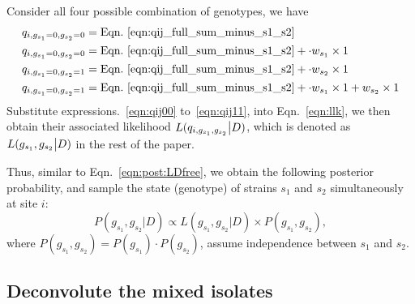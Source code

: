 \documentclass{bioinfo}
\begin{document}
Consider all four possible combination of genotypes, we have
\begin{align}
q_{i,g_{s_1}=0,g_{s_2}=0} & = \textrm{Eqn.~\eqref{eqn:qij_full_sum_minus_s1_s2}} \label{eqn:qij00}\\
q_{i,g_{s_1}=0,g_{s_2}=0} & = \textrm{Eqn.~\eqref{eqn:qij_full_sum_minus_s1_s2}} + \cdot w_{s_1} \times 1 \label{eqn:qij10}\\
q_{i,g_{s_1}=0,g_{s_2}=1} & = \textrm{Eqn.~\eqref{eqn:qij_full_sum_minus_s1_s2}} + \cdot w_{s_2} \times 1 \label{eqn:qij01}\\
q_{i,g_{s_1}=0,g_{s_2}=1} & = \textrm{Eqn.~\eqref{eqn:qij_full_sum_minus_s1_s2}} + \cdot w_{s_1} \times 1 + w_{s_2} \times 1 \label{eqn:qij11}
\end{align}
Substitute expressions.~\eqref{eqn:qij00} to~\eqref{eqn:qij11}, into Eqn.~\eqref{eqn:llk}, we then obtain their associated likelihood $L(q_{i,g_{s_1},g_{s_2}} \big{|} D)$, which is denoted as $L(g_{s_1},g_{s_2} \big{|} D)$ in the rest of the paper.

Thus, similar to Eqn.~\eqref{eqn:post:LDfree}, we obtain the following posterior probability, and sample the state (genotype) of strains $s_1$ and $s_2$ simultaneously at site $i$:
\begin{equation}
P(g_{s_1},g_{s_2} | D) \propto L(g_{s_1},g_{s_2} |D) \times P(g_{s_1},g_{s_2} ),\label{eqn:post.two:LDfree}
\end{equation}
where $P(g_{s_1},g_{s_2}) = P(g_{s_1}) \cdot P(g_{s_2})$, assume independence between $s_1$ and $s_2$. %




\subsection{Deconvolute the mixed isolates}\label{sec:method.deconv}
\end{document}
